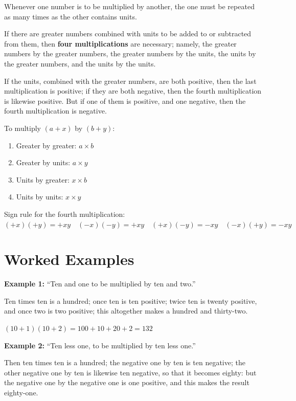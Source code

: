 \documentclass[11pt,a4paper]{book}
\begin{document}
Whenever one number is to be multiplied by another, the one must be repeated
as many times as the other contains units.

If there are greater numbers combined with units to be added to or subtracted
from them, then \textbf{four multiplications} are necessary; namely, the
greater numbers by the greater numbers, the greater numbers by the units, the
units by the greater numbers, and the units by the units.

If the units, combined with the greater numbers, are both positive, then the
last multiplication is positive; if they are both negative, then the fourth
multiplication is likewise positive. But if one of them is positive, and one
negative, then the fourth multiplication is negative.

\begin{mathbox}[title={\textbf{The Fourfold Multiplication Rule}}]
To multiply $(a + x)$ by $(b + y)$:
\begin{enumerate}[label=\arabic*.,leftmargin=2em]
  \item Greater by greater: $a \times b$
  \item Greater by units: $a \times y$
  \item Units by greater: $x \times b$
  \item Units by units: $x \times y$
\end{enumerate}
Sign rule for the fourth multiplication:
$(+x)(+y) = +xy \quad (-x)(-y) = +xy \quad (+x)(-y) = -xy \quad (-x)(+y) = -xy$
\end{mathbox}

\section{Worked Examples}

\textbf{Example 1:} ``Ten and one to be multiplied by ten and two.''

Ten times ten is a hundred; once ten is ten positive; twice ten is twenty
positive, and once two is two positive; this altogether makes a hundred and
thirty-two.

$(10 + 1)(10 + 2) = 100 + 10 + 20 + 2 = 132$

\textbf{Example 2:} ``Ten less one, to be multiplied by ten less one.''

Then ten times ten is a hundred; the negative one by ten is ten negative; the
other negative one by ten is likewise ten negative, so that it becomes
eighty: but the negative one by the negative one is one positive, and this
makes the result eighty-one.
\end{document}
